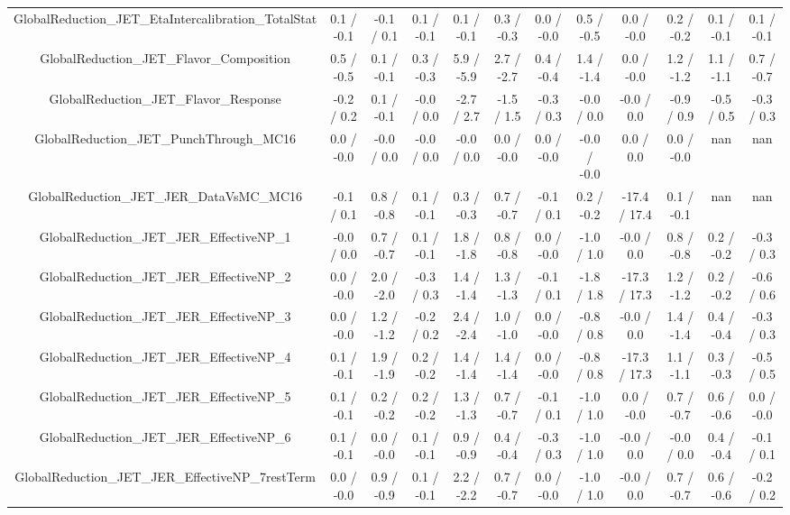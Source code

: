 \begin{table}[htbp]
\begin{center}
\begin{tabular}{|c|c|c|c|c|c|c|c|c|c|c|c|}
  GlobalReduction_JET_EtaIntercalibration_TotalStat & 0.1 / -0.1 & -0.1 / 0.1 & 0.1 / -0.1 & 0.1 / -0.1 & 0.3 / -0.3 & 0.0 / -0.0 & 0.5 / -0.5 & 0.0 / -0.0 & 0.2 / -0.2 & 0.1 / -0.1 & 0.1 / -0.1 \\ 
  GlobalReduction_JET_Flavor_Composition & 0.5 / -0.5 & 0.1 / -0.1 & 0.3 / -0.3 & 5.9 / -5.9 & 2.7 / -2.7 & 0.4 / -0.4 & 1.4 / -1.4 & 0.0 / -0.0 & 1.2 / -1.2 & 1.1 / -1.1 & 0.7 / -0.7 \\ 
  GlobalReduction_JET_Flavor_Response & -0.2 / 0.2 & 0.1 / -0.1 & -0.0 / 0.0 & -2.7 / 2.7 & -1.5 / 1.5 & -0.3 / 0.3 & -0.0 / 0.0 & -0.0 / 0.0 & -0.9 / 0.9 & -0.5 / 0.5 & -0.3 / 0.3 \\ 
  GlobalReduction_JET_PunchThrough_MC16 & 0.0 / -0.0 & -0.0 / 0.0 & -0.0 / 0.0 & -0.0 / 0.0 & 0.0 / -0.0 & 0.0 / -0.0 & -0.0 / -0.0 & 0.0 / 0.0 & 0.0 / -0.0 &    nan    &    nan    \\ 
  GlobalReduction_JET_JER_DataVsMC_MC16 & -0.1 / 0.1 & 0.8 / -0.8 & 0.1 / -0.1 & 0.3 / -0.3 & 0.7 / -0.7 & -0.1 / 0.1 & 0.2 / -0.2 & -17.4 / 17.4 & 0.1 / -0.1 &    nan    &    nan    \\ 
  GlobalReduction_JET_JER_EffectiveNP_1 & -0.0 / 0.0 & 0.7 / -0.7 & 0.1 / -0.1 & 1.8 / -1.8 & 0.8 / -0.8 & 0.0 / -0.0 & -1.0 / 1.0 & -0.0 / 0.0 & 0.8 / -0.8 & 0.2 / -0.2 & -0.3 / 0.3 \\ 
  GlobalReduction_JET_JER_EffectiveNP_2 & 0.0 / -0.0 & 2.0 / -2.0 & -0.3 / 0.3 & 1.4 / -1.4 & 1.3 / -1.3 & -0.1 / 0.1 & -1.8 / 1.8 & -17.3 / 17.3 & 1.2 / -1.2 & 0.2 / -0.2 & -0.6 / 0.6 \\ 
  GlobalReduction_JET_JER_EffectiveNP_3 & 0.0 / -0.0 & 1.2 / -1.2 & -0.2 / 0.2 & 2.4 / -2.4 & 1.0 / -1.0 & 0.0 / -0.0 & -0.8 / 0.8 & -0.0 / 0.0 & 1.4 / -1.4 & 0.4 / -0.4 & -0.3 / 0.3 \\ 
  GlobalReduction_JET_JER_EffectiveNP_4 & 0.1 / -0.1 & 1.9 / -1.9 & 0.2 / -0.2 & 1.4 / -1.4 & 1.4 / -1.4 & 0.0 / -0.0 & -0.8 / 0.8 & -17.3 / 17.3 & 1.1 / -1.1 & 0.3 / -0.3 & -0.5 / 0.5 \\ 
  GlobalReduction_JET_JER_EffectiveNP_5 & 0.1 / -0.1 & 0.2 / -0.2 & 0.2 / -0.2 & 1.3 / -1.3 & 0.7 / -0.7 & -0.1 / 0.1 & -1.0 / 1.0 & 0.0 / -0.0 & 0.7 / -0.7 & 0.6 / -0.6 & 0.0 / -0.0 \\ 
  GlobalReduction_JET_JER_EffectiveNP_6 & 0.1 / -0.1 & 0.0 / -0.0 & 0.1 / -0.1 & 0.9 / -0.9 & 0.4 / -0.4 & -0.3 / 0.3 & -1.0 / 1.0 & -0.0 / 0.0 & -0.0 / 0.0 & 0.4 / -0.4 & -0.1 / 0.1 \\ 
  GlobalReduction_JET_JER_EffectiveNP_7restTerm & 0.0 / -0.0 & 0.9 / -0.9 & 0.1 / -0.1 & 2.2 / -2.2 & 0.7 / -0.7 & 0.0 / -0.0 & -1.0 / 1.0 & -0.0 / 0.0 & 0.7 / -0.7 & 0.6 / -0.6 & -0.2 / 0.2 \\ 

\end{tabular}
\end{center}
\end{table}
